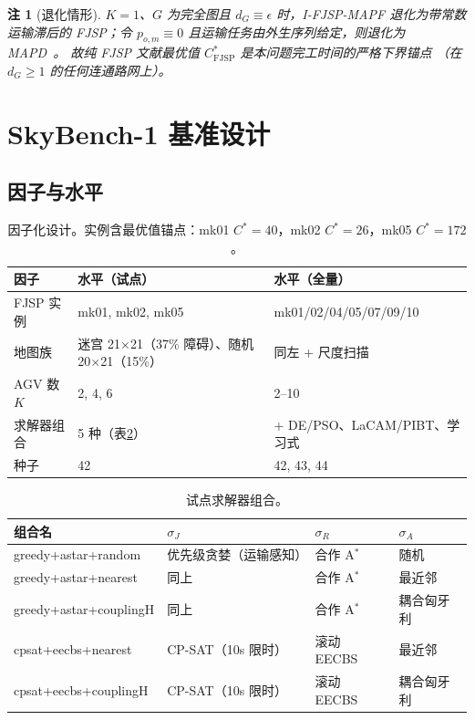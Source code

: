 \documentclass[UTF8,12pt,a4paper]{ctexart}
\newtheorem{remark}{注}
\begin{document}
\begin{remark}[退化情形]
$K=1$、$G$ 为完全图且 $d_G\equiv\epsilon$ 时，I-FJSP-MAPF 退化为带常数运输滞后的
FJSP；令 $p_{o,m}\equiv 0$ 且运输任务由外生序列给定，则退化为 MAPD~\cite{ma2017mapd}。
故纯 FJSP 文献最优值 $C^{*}_{\text{FJSP}}$ 是本问题完工时间的\emph{严格下界锚点}
（在 $d_G\ge 1$ 的任何连通路网上）。
\end{remark}

\section{SkyBench-1 基准设计}\label{sec:design}

\subsection{因子与水平}

\begin{table}[h]
\centering
\begin{tabular}{lll}
\toprule
因子 & 水平（试点） & 水平（全量） \\
\midrule
FJSP 实例 & mk01, mk02, mk05 & mk01/02/04/05/07/09/10 \\
地图族 & 迷宫 21$\times$21（37\% 障碍）、随机 20$\times$21（15\%） & 同左 + 尺度扫描 \\
AGV 数 $K$ & 2, 4, 6 & 2--10 \\
求解器组合 & 5 种（表\ref{tab:combo}） & + DE/PSO、LaCAM/PIBT、学习式 \\
种子 & 42 & 42, 43, 44 \\
\bottomrule
\end{tabular}
\caption{因子化设计。实例含最优值锚点：mk01 $C^*=40$，mk02 $C^*=26$，mk05 $C^*=172$。}
\label{tab:factors}
\end{table}

\begin{table}[h]
\centering
\begin{tabular}{llll}
\toprule
组合名 & $\sigma_J$ & $\sigma_R$ & $\sigma_A$ \\
\midrule
greedy+astar+random & 优先级贪婪（运输感知） & 合作 A$^*$ & 随机 \\
greedy+astar+nearest & 同上 & 合作 A$^*$ & 最近邻 \\
greedy+astar+couplingH & 同上 & 合作 A$^*$ & 耦合匈牙利 \\
cpsat+eecbs+nearest & CP-SAT（10s 限时） & 滚动 EECBS & 最近邻 \\
cpsat+eecbs+couplingH & CP-SAT（10s 限时） & 滚动 EECBS & 耦合匈牙利 \\
\bottomrule
\end{tabular}
\caption{试点求解器组合。}
\label{tab:combo}
\end{table}
\end{document}
